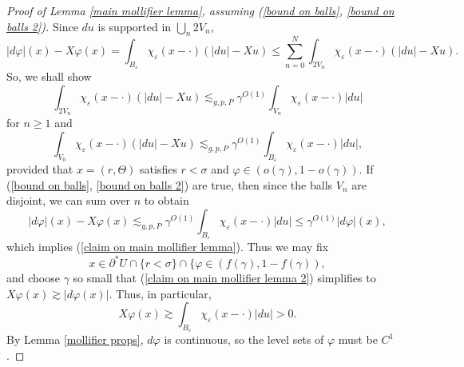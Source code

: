 \begin{proof}[Proof of Lemma \ref{main mollifier lemma}, assuming (\ref{bound on balls}, \ref{bound on balls 2})]
Since $du$ is supported in $\bigcup_n 2V_n$,
$$|d\varphi|(x) - X\varphi(x) = \int_{B_\varepsilon} \chi_\varepsilon(x - \cdot)(|du| - Xu) \leq \sum_{n=0}^N \int_{2V_n} \chi_\varepsilon(x - \cdot)(|du| - Xu).$$
So, we shall show
\begin{equation}\label{bound on balls}
\int_{2V_n} \chi_\varepsilon(x - \cdot)(|du| - Xu) \lesssim_{g, p, P} \gamma^{O(1)} \int_{V_n} \chi_\varepsilon(x - \cdot)|du|
\end{equation}
for $n \geq 1$ and
\begin{equation}\label{bound on balls 2}
\int_{V_0} \chi_\varepsilon(x - \cdot)(|du| - Xu) \lesssim_{g, p, P} \gamma^{O(1)} \int_{B_\varepsilon} \chi_\varepsilon(x - \cdot)|du|,
\end{equation}
provided that $x = (r, \Theta)$ satisfies $r < \sigma$ and $\varphi \in (o(\gamma), 1 - o(\gamma))$.
If (\ref{bound on balls}, \ref{bound on balls 2}) are true, then since the balls $V_n$ are disjoint, we can sum over $n$ to obtain
\begin{equation}\label{claim on main mollifier lemma 2}|d\varphi|(x) - X\varphi(x) \lesssim_{g, p, P} \gamma^{O(1)} \int_{B_\varepsilon} \chi_\varepsilon(x - \cdot)|du| \leq \gamma^{O(1)} |d\varphi|(x),
\end{equation}
which implies (\ref{claim on main mollifier lemma}). Thus we may fix
$$x \in \partial^* U \cap \{r < \sigma\} \cap \{\varphi \in (f(\gamma), 1 - f(\gamma)),$$
and choose $\gamma$ so small that (\ref{claim on main mollifier lemma 2}) simplifies to $X\varphi(x) \gtrsim |d\varphi(x)|$.
Thus, in particular,
$$X\varphi(x) \gtrsim \int_{B_\varepsilon} \chi_\varepsilon(x - \cdot) |du| > 0.$$
By Lemma \ref{mollifier props}, $d\varphi$ is continuous, so the level sets of $\varphi$ must be $C^1$.
\end{proof}

